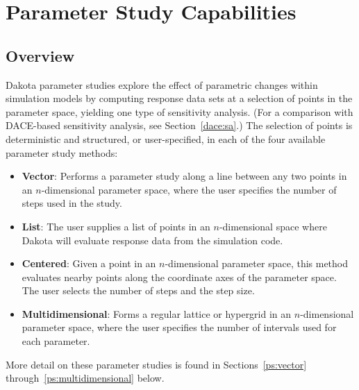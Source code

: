 \chapter{Parameter Study Capabilities}\label{ps}

\section{Overview}\label{ps:overview}

Dakota parameter studies explore the effect of parametric changes
within simulation models by computing response data sets at a
selection of points in the parameter space, yielding one type of
sensitivity analysis. (For a comparison with DACE-based sensitivity
analysis, see Section~\ref{dace:sa}.) The selection of points is
deterministic and structured, or user-specified, in each of the four
available parameter study methods:
\begin{itemize}
\item \textbf{Vector}: Performs a parameter study along a line between
  any two points in an $n$-dimensional parameter space, where the user
  specifies the number of steps used in the study.

\item \textbf{List}: The user supplies a list of points in an
  $n$-dimensional space where Dakota will evaluate response data from
  the simulation code.

\item \textbf{Centered}: Given a point in an $n$-dimensional parameter
  space, this method evaluates nearby points along the coordinate axes
  of the parameter space. The user selects the number of steps and the
  step size.

\item \textbf{Multidimensional}: Forms a regular lattice or hypergrid
  in an $n$-dimensional parameter space, where the user specifies the
  number of intervals used for each parameter.
\end{itemize}
More detail on these parameter studies is found in
Sections~\ref{ps:vector} through~\ref{ps:multidimensional} below.

